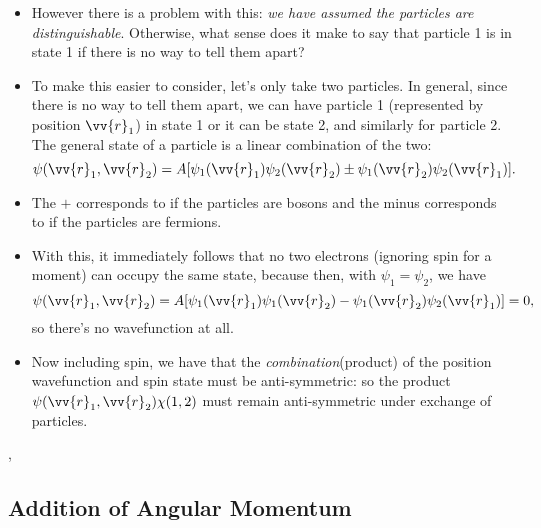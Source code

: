 \begin{itemize}
    \item However there is a problem with this: \textit{we have assumed the particles are distinguishable}. Otherwise, what sense does it make to say that particle 1 is in state 1 if there is no way to tell them apart?
    \item To make this easier to consider, let's only take two particles. In general, since there is no way to tell them apart, we can have particle 1 (represented by position $\vv{r}_1$) in state 1 or it can be state 2, and similarly for particle 2. The general state of a particle is a linear combination of the two:
        \begin{equation}
            \psi(\vv{r}_1,\vv{r}_2) = A[\psi_1(\vv{r}_1)\psi_2(\vv{r}_2) \pm \psi_1(\vv{r}_2)\psi_2(\vv{r}_1)].
        \end{equation}
    \item The $+$ corresponds to if the particles are bosons and the minus corresponds to if the particles are fermions.
    \item With this, it immediately follows that no two electrons (ignoring spin for a moment) can occupy the same state, because then, with $\psi_1=\psi_2$, we have
        \begin{equation}
            \psi(\vv{r}_1,\vv{r}_2) = A[\psi_1(\vv{r}_1)\psi_1(\vv{r}_2) - \psi_1(\vv{r}_2)\psi_2(\vv{r}_1)] = 0,
        \end{equation}
        so there's no wavefunction at all.
    \item Now including spin, we have that the \textit{combination}(product) of the position wavefunction and spin state must be anti-symmetric: so the product $\psi(\vv{r}_1,\vv{r}_2)\chi(1,2)$ must remain anti-symmetric under exchange of particles. 
\end{itemize}

\sep

\subsection*{Addition of Angular Momentum}

